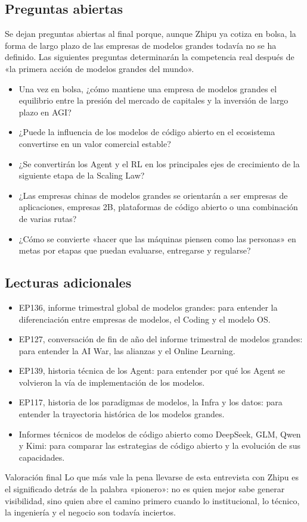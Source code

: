 \documentclass[a4paper]{article}
\begin{document}
\subsection{Preguntas abiertas}

Se dejan preguntas abiertas al final porque, aunque Zhipu ya cotiza en bolsa, la forma de largo plazo de las empresas de modelos grandes todavía no se ha definido. Las siguientes preguntas determinarán la competencia real después de «la primera acción de modelos grandes del mundo».

\begin{itemize}
\item Una vez en bolsa, ¿cómo mantiene una empresa de modelos grandes el equilibrio entre la presión del mercado de capitales y la inversión de largo plazo en AGI?
\item ¿Puede la influencia de los modelos de código abierto en el ecosistema convertirse en un valor comercial estable?
\item ¿Se convertirán los Agent y el RL en los principales ejes de crecimiento de la siguiente etapa de la Scaling Law?
\item ¿Las empresas chinas de modelos grandes se orientarán a ser empresas de aplicaciones, empresas 2B, plataformas de código abierto o una combinación de varias rutas?
\item ¿Cómo se convierte «hacer que las máquinas piensen como las personas» en metas por etapas que puedan evaluarse, entregarse y regularse?
\end{itemize}

\subsection{Lecturas adicionales}

\begin{itemize}
\item EP136, informe trimestral global de modelos grandes: para entender la diferenciación entre empresas de modelos, el Coding y el modelo OS.
\item EP127, conversación de fin de año del informe trimestral de modelos grandes: para entender la AI War, las alianzas y el Online Learning.
\item EP139, historia técnica de los Agent: para entender por qué los Agent se volvieron la vía de implementación de los modelos.
\item EP117, historia de los paradigmas de modelos, la Infra y los datos: para entender la trayectoria histórica de los modelos grandes.
\item Informes técnicos de modelos de código abierto como DeepSeek, GLM, Qwen y Kimi: para comparar las estrategias de código abierto y la evolución de sus capacidades.
\end{itemize}

\begin{importantbox}{Valoración final}
Lo que más vale la pena llevarse de esta entrevista con Zhipu es el significado detrás de la palabra «pionero»: no es quien mejor sabe generar visibilidad, sino quien abre el camino primero cuando lo institucional, lo técnico, la ingeniería y el negocio son todavía inciertos.
\end{importantbox}
\end{document}
